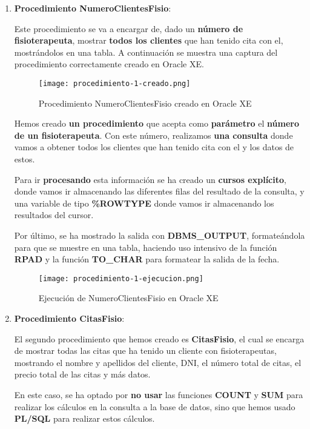 \begin{enumerate}[label=\Alph*)]
    \item \textbf{Procedimiento NumeroClientesFisio}:

    Este procedimiento se va a encargar de, dado un \textbf{número de fisioterapeuta}, mostrar \textbf{todos los clientes} que han tenido cita con el, mostrándolos en una tabla. A continuación se muestra una captura del procedimiento correctamente creado en Oracle XE.

    \begin{figure}[H]
        \centering
        \texttt{[image: procedimiento-1-creado.png]}
        \caption{Procedimiento NumeroClientesFisio creado en Oracle XE}
    \end{figure}

    Hemos creado \textbf{un procedimiento} que acepta como \textbf{parámetro} el \textbf{número de un fisioterapeuta}. Con este número, realizamos \textbf{una consulta} donde vamos a obtener todos los clientes que han tenido cita con el y los datos de estos.

    Para ir \textbf{procesando} esta información se ha creado un \textbf{cursos explícito}, donde vamos ir almacenando las diferentes filas del resultado de la consulta, y una variable de tipo \textbf{\%ROWTYPE} donde vamos ir almacenando los resultados del cursor.

    Por último, se ha mostrado la salida con \textbf{DBMS\_OUTPUT}, formateándola para que se muestre en una tabla, haciendo uso intensivo de la función \textbf{RPAD} y la función \textbf{TO\_CHAR} para formatear la salida de la fecha.

    \begin{figure}[H]
        \centering
        \texttt{[image: procedimiento-1-ejecucion.png]}
        \caption{Ejecución de NumeroClientesFisio en Oracle XE}
    \end{figure}

    \item \textbf{Procedimiento CitasFisio}:

    El segundo procedimiento que hemos creado es \textbf{CitasFisio}, el cual se encarga de mostrar todas las citas que ha tenido un cliente con fisioterapeutas, mostrando el nombre y apellidos del cliente, DNI, el número total de citas, el precio total de las citas y más datos.

    En este caso, se ha optado por \textbf{no usar} las funciones \textbf{COUNT} y \textbf{SUM} para realizar los cálculos en la consulta a la base de datos, sino que hemos usado \textbf{PL/SQL} para realizar estos cálculos.


\end{enumerate}
